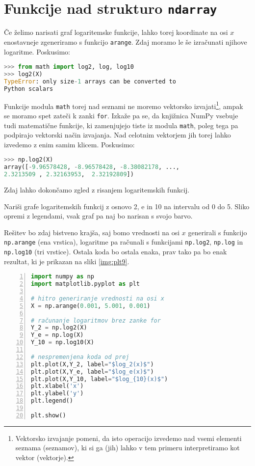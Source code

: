 \section{Funkcije nad strukturo \texttt{ndarray}}
Če želimo narisati graf logaritemske funkcije, lahko torej koordinate na osi $x$ enostavneje zgeneriramo s funkcijo \texttt{arange}. Zdaj moramo le še izračunati njihove logaritme. Poskusimo:
\begin{lstlisting}[language=Python]
>>> from math import log2, log, log10
>>> log2(X)
TypeError: only size-1 arrays can be converted to
Python scalars
\end{lstlisting}
Funkcije modula \texttt{math} torej nad seznami ne moremo vektorsko izvajati\footnote{Vektorsko izvajanje pomeni, da isto operacijo izvedemo nad vsemi elementi seznama (seznamov), ki si ga (jih) lahko v tem primeru interpretiramo kot vektor (vektorje).}, ampak se moramo spet zateči k zanki \texttt{for}. Izkaže pa se, da knjižnica NumPy vsebuje tudi matematične funkcije, ki zamenjujejo tiste iz modula \texttt{math}, poleg tega pa podpirajo vektorski način izvajanja. Nad celotnim vektorjem jih torej lahko izvedemo z enim samim klicem. Poskusimo:
\begin{lstlisting}[language=Python]
>>> np.log2(X)
array([-9.96578428, -8.96578428, -8.38082178, ...,
2.3213509 , 2.32163953,  2.32192809])
\end{lstlisting}

Zdaj lahko dokončamo zgled z risanjem logaritemskih funkcij.

\begin{zgled}
Nariši grafe logaritemskih funkcij z osnovo 2, $\textrm{e}$ in 10 na intervalu od 0 do 5. Sliko opremi z legendami, vsak graf pa naj bo narisan s svojo barvo.
\end{zgled}

\begin{resitev}
Rešitev bo zdaj bistveno krajša, saj bomo vrednosti na osi $x$ generirali s funkcijo \texttt{np.arange} (ena vrstica), logaritme pa računali s funkcijami \texttt{np.log2}, \texttt{np.log} in \texttt{np.log10} (tri vrstice). Ostala koda bo ostala enaka, prav tako pa bo enak rezultat, ki je prikazan na sliki \ref{img:plt9}.
\begin{lstlisting}[language=Python,numbers=left]
import numpy as np
import matplotlib.pyplot as plt

# hitro generiranje vrednosti na osi x
X = np.arange(0.001, 5.001, 0.001) 

# računanje logaritmov brez zanke for 
Y_2 = np.log2(X)
Y_e = np.log(X)
Y_10 = np.log10(X)

# nespremenjena koda od prej
plt.plot(X,Y_2, label="$log_2(x)$")
plt.plot(X,Y_e, label="$log_e(x)$")
plt.plot(X,Y_10, label="$log_{10}(x)$")
plt.xlabel('x')
plt.ylabel('y')
plt.legend()

plt.show()
\end{lstlisting}
\end{resitev}

